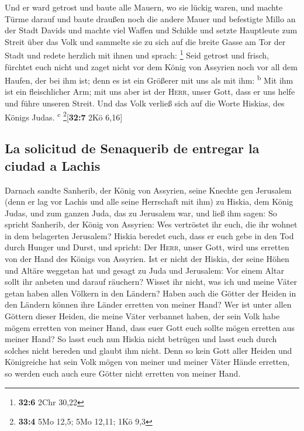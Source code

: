  Und er ward getrost und baute alle Mauern, wo sie lückig
waren, und machte Türme darauf und baute draußen noch die andere Mauer
und befestigte Millo an der Stadt Davids und machte viel Waffen und
Schilde  und setzte Hauptleute zum Streit über das Volk
und sammelte sie zu sich auf die breite Gasse am Tor der Stadt und
redete herzlich mit ihnen und sprach: \footnote{\textbf{32:6} 2Chr 30,22}
 Seid getrost und frisch, fürchtet euch nicht und zaget
nicht vor dem König von Assyrien noch vor all dem Haufen, der bei ihm
ist; denn es ist ein Größerer mit uns als mit ihm: \textsuperscript{b}
 Mit ihm ist ein fleischlicher Arm; mit uns aber ist der
\textsc{Herr}, unser Gott, dass er uns helfe und führe unseren Streit.
Und das Volk verließ sich auf die Worte Hiskias, des Königs Judas.
\textsuperscript{c} \footnote{\textbf{33:4} 5Mo 12,5; 5Mo 12,11; 1Kö 9,3}{[}\textbf{32:7}
2Kö 6,16{]}

\hypertarget{la-solicitud-de-senaquerib-de-entregar-la-ciudad-a-lachis}{%
\subsection{La solicitud de Senaquerib de entregar la ciudad a
Lachis}\label{la-solicitud-de-senaquerib-de-entregar-la-ciudad-a-lachis}}

 Darnach sandte Sanherib, der König von Assyrien, seine
Knechte gen Jerusalem (denn er lag vor Lachis und alle seine Herrschaft
mit ihm) zu Hiskia, dem König Judas, und zum ganzen Juda, das zu
Jerusalem war, und ließ ihm sagen:  So spricht Sanherib,
der König von Assyrien: Wes vertröstet ihr euch, die ihr wohnet in dem
belagerten Jerusalem?  Hiskia beredet euch, dass er euch
gebe in den Tod durch Hunger und Durst, und spricht: Der \textsc{Herr},
unser Gott, wird uns erretten von der Hand des Königs von Assyrien.
 Ist er nicht der Hiskia, der seine Höhen und Altäre
weggetan hat und gesagt zu Juda und Jerusalem: Vor einem Altar sollt ihr
anbeten und darauf räuchern?  Wisset ihr nicht, was ich
und meine Väter getan haben allen Völkern in den Ländern? Haben auch die
Götter der Heiden in den Ländern können ihre Länder erretten von meiner
Hand?  Wer ist unter allen Göttern dieser Heiden, die
meine Väter verbannet haben, der sein Volk habe mögem erretten von
meiner Hand, dass euer Gott euch sollte mögen erretten aus meiner Hand?
 So lasst euch nun Hiskia nicht betrügen und lasst euch
durch solches nicht bereden und glaubt ihm nicht. Denn so kein Gott
aller Heiden und Königreiche hat sein Volk mögen von meiner und meiner
Väter Hände erretten, so werden euch auch eure Götter nicht erretten von
meiner Hand.

